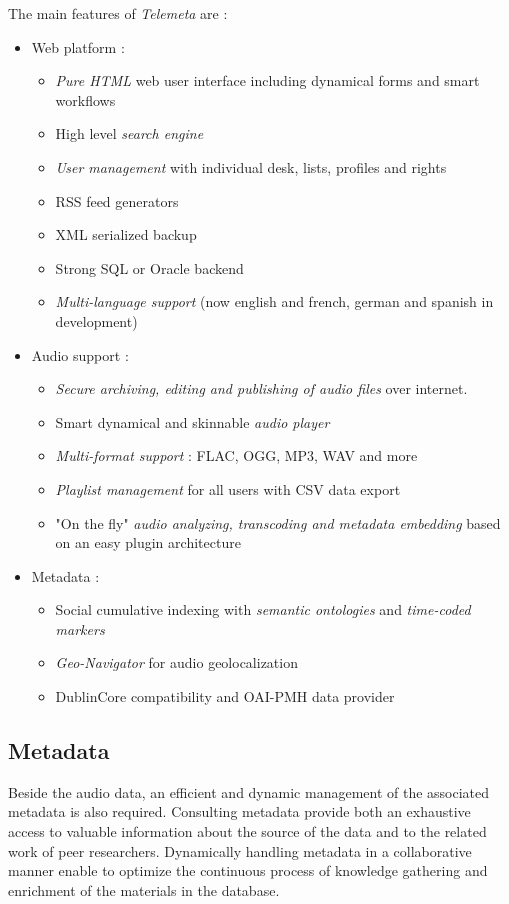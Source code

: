 \documentclass[runningheads,a4paper]{llncs}
\begin{document}
The main features of \emph{Telemeta} are :
\begin{itemize}
\item Web platform :
  \begin{itemize}
  \item \emph{Pure HTML} web user interface including dynamical forms and
    smart workflows
  \item High level \emph{search engine}
  \item \emph{User management} with individual desk, lists, profiles and
    rights
  \item RSS feed generators
  \item XML serialized backup
  \item Strong SQL or Oracle backend
  \item \emph{Multi-language support} (now english and french, german and
    spanish in development)
  \end{itemize}
\item Audio support :
  \begin{itemize}
  \item \emph{Secure archiving, editing and publishing of audio files} over
    internet.
  \item Smart dynamical and skinnable \emph{audio player}
  \item \emph{Multi-format support} : FLAC, OGG, MP3, WAV and more
  \item \emph{Playlist management} for all users with CSV data export
  \item "On the fly" \emph{audio analyzing, transcoding and metadata
    embedding} based on an easy plugin architecture
  \end{itemize}
\item Metadata :   
  \begin{itemize}
  \item Social cumulative indexing with \emph{semantic ontologies} and
    \emph{time-coded markers}
  \item \emph{Geo-Navigator} for audio geolocalization
  \item DublinCore compatibility ​and OAI-PMH data provider
  \end{itemize}
\end{itemize}


\subsection{Metadata}\label{sec:metadata}
Beside the audio data, an efficient and dynamic management of the associated metadata is also required. Consulting metadata provide both an exhaustive access to valuable information about the source of the data and to the related work of peer researchers. 
Dynamically handling metadata in a collaborative manner enable to optimize the continuous process of knowledge gathering and enrichment of the materials in the database.  
\end{document}
